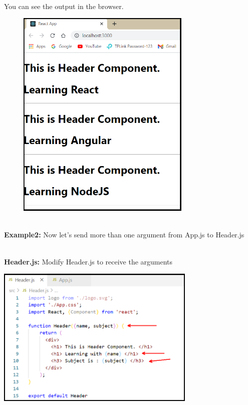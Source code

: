 \documentclass{article}
\begin{document}
\noindent 

\noindent \\
You can see the output in the browser.

\begin{center}
	\noindent \includegraphics*[width=4.10in, height=4.00in]{IMG-08-06}
\end{center}

\noindent 

\noindent 

\noindent 
\newpage
\noindent \\
\textbf{Example2: }Now let's send more than one argument from App.js to Header.js

\noindent \textbf{}

\noindent \\
\textbf{Header.js:} Modify Header.js to receive the arguments

\begin{center}
	\noindent \includegraphics*[width=3.76in, height=2.64in]{IMG-08-07}
\end{center}
\end{document}

